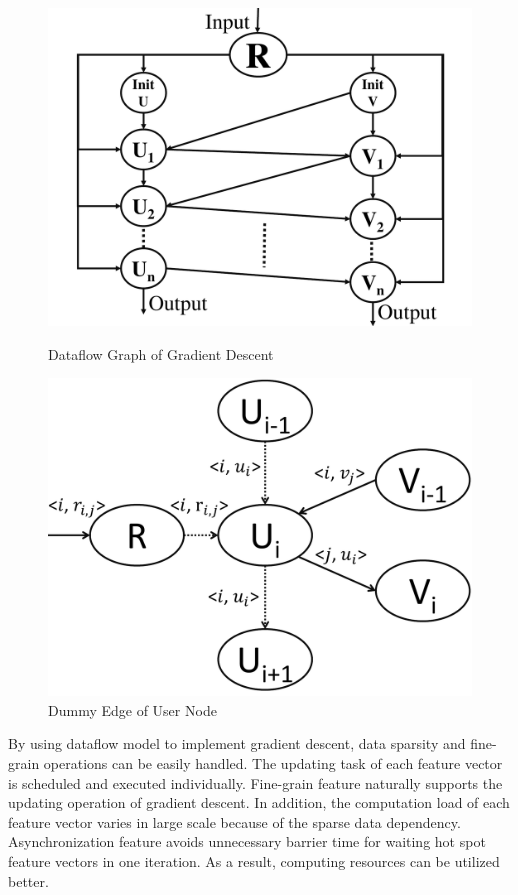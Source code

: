 \documentclass{llncs}
\begin{document}
\begin{figure}[h]
\begin{minipage}[t]{0.45\linewidth}
\centering
\includegraphics[width=\textwidth]{pics/gdGraph.pdf}
\caption{Dataflow Graph of Gradient Descent \label{fig:gdGraph}}
\end{minipage}
\hfill
\begin{minipage}[t]{0.45\linewidth}
\centering
\includegraphics[width=\textwidth]{pics/dummyEdge.pdf}
\caption{Dummy Edge of User Node \label{fig:dummyEdge}}
\end{minipage}
\vspace{-20pt}
\end{figure}

By using dataflow model to implement gradient descent, data sparsity and fine-grain operations can be easily handled. The updating task of each feature vector is scheduled and executed individually. Fine-grain feature naturally supports the updating operation of gradient descent. In addition, the computation load of each feature vector varies in large scale because of the sparse data dependency. Asynchronization feature avoids unnecessary barrier time for waiting hot spot feature vectors in one iteration. As a result, computing resources can be utilized better.
\end{document}
